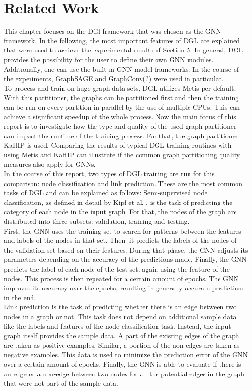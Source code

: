 \documentclass[acmsmall,nonacm,screen,review]{acmart}
\begin{document}
\section{Related Work}
This chapter focuses on the DGl framework that was chosen as the GNN framework. In the following, the most important features of DGL are explained that were used to achieve the experimental results of Section 5. In general, DGL provides the possibility for the user to define their own GNN modules. Additionally, one can use the built-in GNN model frameworks. In the course of the experiments, GraphSAGE \cite{GraphSAGE} and GraphConv(?) \cite{NC} were used in particular. \\
To process and train on huge graph data sets, DGL utilizes Metis per default. With this partitioner, the graphs can be partitioned first and then the training can be run on every partition in parallel by the use of multiple CPUs. This can achieve a significant speedup of the whole process. Now the main focus of this report is to investigate how the type and quality of the used graph partitioner can impact the runtime of the training process. For that, the graph partitioner KaHIP is used. Comparing the results of typical DGL training routines with using Metis and KaHIP can illustrate if the common graph partitioning quality measures also apply for GNNs. \\
In the course of this report, two types of DGL training are run for this comparison: node classification and link prediction. These are the most common tasks of DGL and can be explained as follows: Semi-supervised node classification, as defined in detail by Kipf et al. \cite{NC}, is the task of predicting the category of each node in the input graph. For that, the nodes of the graph are distributed into three subsets: validation, training and testing. \\ First, the GNN uses the training set to search for patterns between the features and labels of the nodes in that set. Then, it predicts the labels of the nodes of the validation set based on their features. During that phase, the GNN adjusts its parameters depending on the accuracy of the predictions made. Finally, the GNN predicts the label of each node of the test set, again using the feature of the nodes. This process is then repeated for a certain amount of epochs. The GNN improves its accuracy over the epochs, resulting in generally accurate predictions in the end. \\
Link prediction is the task of predicting whether there is an edge between two nodes in a graph or not. This task does not depend on additional sample data like the labels and features of the node classification task. Instead, the input graph itself provides the sample data. A part of the existing edges of the graph are taken as positive examples. Similar, a portion of the non-edges are taken as negative examples. This data is used to minimize the prediction error of the GNN over a certain amount of epochs. Finally, the GNN is able to evaluate if there is an edge or a non-edge between two nodes for all the potential edges in the graph that were not part of the sample data.
\end{document}
